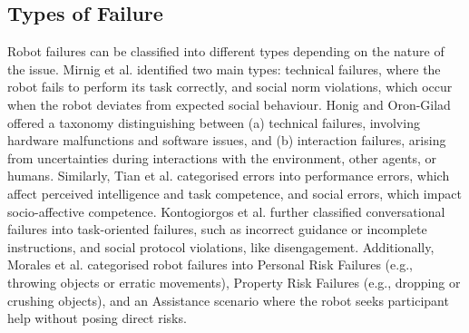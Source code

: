 \subsection{Types of Failure}

 Robot failures can be classified into different types depending on the nature of the issue. Mirnig et al. \cite{mirnig_impact_2015} identified two main types: technical failures, where the robot fails to perform its task correctly, and social norm violations, which occur when the robot deviates from expected social behaviour. 
Honig and Oron-Gilad \cite{honig_understanding_2018} offered a taxonomy distinguishing between (a) technical failures, involving hardware malfunctions and software issues, and (b) interaction failures, arising from uncertainties during interactions with the environment, other agents, or humans. Similarly, Tian et al. \cite{tian_taxonomy_2021} categorised errors into performance errors, which affect perceived intelligence and task competence, and social errors, which impact socio-affective competence. Kontogiorgos et al. \cite{kontogiorgos_embodiment_2020} further classified conversational failures into task-oriented failures, such as incorrect guidance or incomplete instructions, and social protocol violations, like disengagement. Additionally, Morales et al. \cite{morales_interaction_2019} categorised robot failures into Personal Risk Failures (e.g., throwing objects or erratic movements), Property Risk Failures (e.g., dropping or crushing objects), and an Assistance scenario where the robot seeks participant help without posing direct risks.



